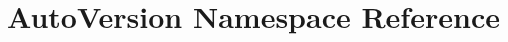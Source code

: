 \hypertarget{namespace_auto_version}{\section{Auto\-Version Namespace Reference}
\label{namespace_auto_version}
}
